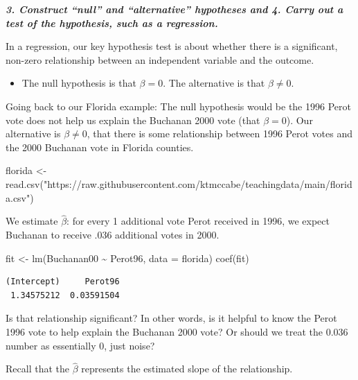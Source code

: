 \documentclass[
  letterpaper,
  DIV=11,
  numbers=noendperiod]{scrreprt}
\newenvironment{Shaded}{\begin{snugshade}}{\end{snugshade}}
\newcommand{\AttributeTok}[1]{\textcolor[rgb]{0.40,0.45,0.13}{#1}}
\newcommand{\FunctionTok}[1]{\textcolor[rgb]{0.28,0.35,0.67}{#1}}
\newcommand{\NormalTok}[1]{\textcolor[rgb]{0.00,0.23,0.31}{#1}}
\newcommand{\OtherTok}[1]{\textcolor[rgb]{0.00,0.23,0.31}{#1}}
\newcommand{\SpecialCharTok}[1]{\textcolor[rgb]{0.37,0.37,0.37}{#1}}
\newcommand{\StringTok}[1]{\textcolor[rgb]{0.13,0.47,0.30}{#1}}
\providecommand{\tightlist}{%
  \setlength{\itemsep}{0pt}\setlength{\parskip}{0pt}}\usepackage{longtable,booktabs,array}
\begin{document}
\textbf{\emph{3. Construct ``null'' and ``alternative'' hypotheses and
4. Carry out a test of the hypothesis, such as a regression.}}

In a regression, our key hypothesis test is about whether there is a
significant, non-zero relationship between an independent variable and
the outcome.

\begin{itemize}
\tightlist
\item
  The null hypothesis is that \(\beta = 0\). The alternative is that
  \(\beta \neq 0\).
\end{itemize}

Going back to our Florida example: The null hypothesis would be the 1996
Perot vote does not help us explain the Buchanan 2000 vote (that
\(\beta = 0\)). Our alternative is \(\beta \neq 0\), that there is some
relationship between 1996 Perot votes and the 2000 Buchanan vote in
Florida counties.

\begin{Shaded}
\begin{Highlighting}[]
\NormalTok{florida }\OtherTok{\textless{}{-}} \FunctionTok{read.csv}\NormalTok{(}\StringTok{"https://raw.githubusercontent.com/ktmccabe/teachingdata/main/florida.csv"}\NormalTok{)}
\end{Highlighting}
\end{Shaded}

We estimate \(\hat \beta\): for every 1 additional vote Perot received
in 1996, we expect Buchanan to receive .036 additional votes in 2000.

\begin{Shaded}
\begin{Highlighting}[]
\NormalTok{fit }\OtherTok{\textless{}{-}} \FunctionTok{lm}\NormalTok{(Buchanan00 }\SpecialCharTok{\textasciitilde{}}\NormalTok{ Perot96, }\AttributeTok{data =}\NormalTok{ florida)}
\FunctionTok{coef}\NormalTok{(fit)}
\end{Highlighting}
\end{Shaded}

\begin{verbatim}
(Intercept)     Perot96 
 1.34575212  0.03591504 
\end{verbatim}

Is that relationship significant? In other words, is it helpful to know
the Perot 1996 vote to help explain the Buchanan 2000 vote? Or should we
treat the 0.036 number as essentially 0, just noise?

Recall that the \(\hat \beta\) represents the estimated slope of the
relationship.
\end{document}
